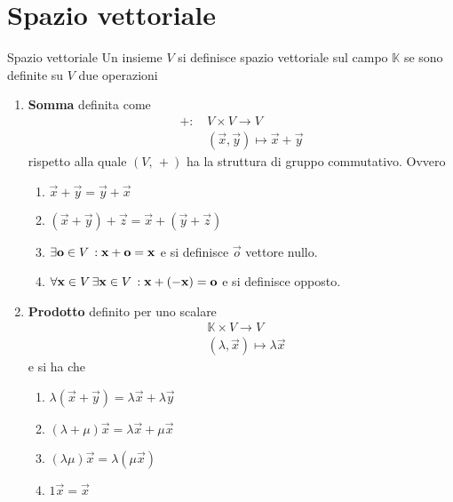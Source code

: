 
\section{Spazio vettoriale}%
\label{sec:spazio_vettoriale}

\begin{Def}{Spazio vettoriale}
  Un insieme $V$ si definisce spazio vettoriale sul campo $\mathbb{K}$ se sono definite
  su $V$ due operazioni
  \begin{enumerate}
    \item \textbf{Somma} definita come
      \begin{align*}
        +:\,&V\times V\to V\\
            &(\vec{x},\vec{y})\mapsto\vec{x}+\vec{y}
      \end{align*}
      rispetto alla quale $(V,\,+)$ ha la struttura di gruppo commutativo. Ovvero
      \begin{enumerate}
        \item $\vec{x}+\vec{y} = \vec{y}+\vec{x}$
        \item $(\vec{x}+\vec{y})+\vec{z} = \vec{x} + (\vec{y}+\vec{z})$
        \item $\exists\mathbf{o}\in V\,: \mathbf{x}+\mathbf{o}=\mathbf{x}$ e si definisce
          $\vec{o}$ vettore nullo.
        \item $\forall\mathbf{x}\in V\,\exists\mathbf{x}\in
          V\,:\mathbf{x}+(-\mathbf{x})=\mathbf{o}$ e si definisce opposto.
      \end{enumerate}
    \item \textbf{Prodotto} definito per uno scalare
      \begin{align*}
        &\mathbb{K}\times V\to V\\
        &(\lambda,\vec{x})\mapsto \lambda\vec{x}
      \end{align*}
      e si ha che
      \begin{enumerate}
        \item $\lambda(\vec{x}+\vec{y}) = \lambda\vec{x}+\lambda\vec{y}$
        \item $(\lambda+\mu)\vec{x} = \lambda\vec{x}+\mu\vec{x}$
        \item $(\lambda\mu)\vec{x} = \lambda(\mu\vec{x})$
        \item $1\vec{x} = \vec{x}$
      \end{enumerate}
  \end{enumerate}
\end{Def}

